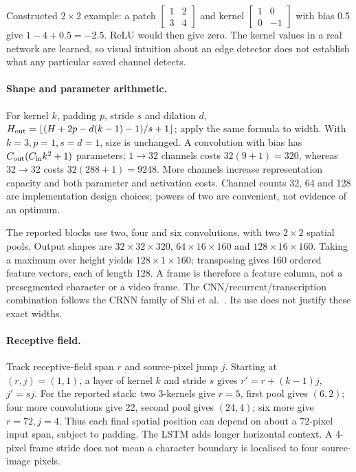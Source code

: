 Constructed $2\times2$ example: a patch
$\left[\begin{smallmatrix}1&2\\3&4\end{smallmatrix}\right]$ and kernel
$\left[\begin{smallmatrix}1&0\\0&-1\end{smallmatrix}\right]$ with bias 0.5
give $1-4+0.5=-2.5$. ReLU would then give zero. The kernel values in a
real network are learned, so visual intuition about an edge detector does
not establish what any particular saved channel detects.

\paragraph{Shape and parameter arithmetic.}
For kernel $k$, padding $p$, stride $s$ and dilation $d$,
$H_{\rm out}=\lfloor(H+2p-d(k-1)-1)/s+1\rfloor$; apply the same formula
to width. With $k=3,p=1,s=d=1$, size is unchanged. A convolution with bias
has $C_{\rm out}(C_{\rm in}k^2+1)$ parameters; $1\to32$ channels costs
$32(9+1)=320$, whereas $32\to32$ costs $32(288+1)=9248$.
More channels increase representation capacity and both parameter and
activation costs. Channel counts 32, 64 and 128 are implementation design
choices; powers of two are convenient, not evidence of an optimum.

The reported blocks use two, four and six convolutions, with two $2\times2$
spatial pools. Output shapes are $32\times32\times320$,
$64\times16\times160$ and $128\times16\times160$.
Taking a maximum over height yields $128\times1\times160$; transposing
gives 160 ordered feature vectors, each of length 128. A frame is therefore
a feature column, not a presegmented character or a video frame.
The CNN/recurrent/transcription combination follows the CRNN family
of Shi et al.~\cite{shi2017}. Its use does not justify these exact widths.

\paragraph{Receptive field.}
Track receptive-field span $r$ and source-pixel jump $j$. Starting at
$(r,j)=(1,1)$, a layer of kernel $k$ and stride $s$ gives
$r'=r+(k-1)j$, $j'=sj$. For the reported stack: two $3$-kernels give
$r=5$, first pool gives $(6,2)$; four more convolutions give 22, second
pool gives $(24,4)$; six more give $r=72,j=4$. Thus each final spatial
position can depend on about a $72$-pixel input span, subject to padding.
The LSTM adds longer horizontal context. A 4-pixel frame stride does not
mean a character boundary is localised to four source-image pixels.


